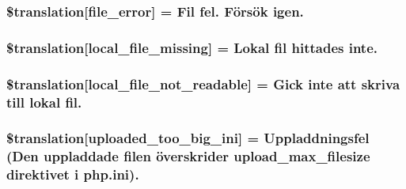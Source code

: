 \subsubsection[{\$translation}]{\setlength{\rightskip}{0pt plus 5cm}\$translation\mbox{[}\textquotesingle{}file\+\_\+error\textquotesingle{}\mbox{]} = \textquotesingle{}Fil fel. Försök igen.\textquotesingle{}}\label{class_8upload_8sv___s_e_8php_ac7498e49b9771b04698029aa61c70821}
\hypertarget{class_8upload_8sv___s_e_8php_a6ec3d3a47ab70d77e7aa593e82ead10e}{}
\subsubsection[{\$translation}]{\setlength{\rightskip}{0pt plus 5cm}\$translation\mbox{[}\textquotesingle{}local\+\_\+file\+\_\+missing\textquotesingle{}\mbox{]} = \textquotesingle{}Lokal fil hittades inte.\textquotesingle{}}\label{class_8upload_8sv___s_e_8php_a6ec3d3a47ab70d77e7aa593e82ead10e}
\hypertarget{class_8upload_8sv___s_e_8php_a60104befef9b241f3a7a6a755618a4b3}{}
\subsubsection[{\$translation}]{\setlength{\rightskip}{0pt plus 5cm}\$translation\mbox{[}\textquotesingle{}local\+\_\+file\+\_\+not\+\_\+readable\textquotesingle{}\mbox{]} = \textquotesingle{}Gick inte att skriva till lokal fil.\textquotesingle{}}\label{class_8upload_8sv___s_e_8php_a60104befef9b241f3a7a6a755618a4b3}
\hypertarget{class_8upload_8sv___s_e_8php_a6a08dcd0d3651fdd098568f6b2f0a42c}{}
\subsubsection[{\$translation}]{\setlength{\rightskip}{0pt plus 5cm}\$translation\mbox{[}\textquotesingle{}uploaded\+\_\+too\+\_\+big\+\_\+ini\textquotesingle{}\mbox{]} = \textquotesingle{}Uppladdningsfel (Den uppladdade filen överskrider upload\+\_\+max\+\_\+filesize direktivet i php.\+ini).\textquotesingle{}}\label{class_8upload_8sv___s_e_8php_a6a08dcd0d3651fdd098568f6b2f0a42c}
\hypertarget{class_8upload_8sv___s_e_8php_a623d5b8b92169f57d7e43458aa911cbb}{}
